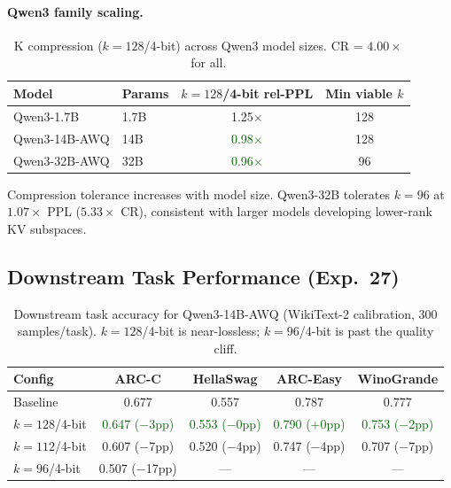 \documentclass{article}
\begin{document}
\paragraph{Qwen3 family scaling.}
\begin{table}[h]
  \centering
  \caption{K compression ($k{=}128$/4-bit) across Qwen3 model sizes. CR =
  $4.00{\times}$ for all.}
  \label{tab:qwen_scale}
  \begin{tabular}{@{}llcc@{}}
    \toprule
    Model & Params & $k{=}128$/4-bit rel-PPL & Min viable $k$ \\
    \midrule
    Qwen3-1.7B    & 1.7B  & 1.25$\times$ & 128 \\
    Qwen3-14B-AWQ & 14B   & \textcolor{darkgreen}{0.98$\times$} & 128 \\
    Qwen3-32B-AWQ & 32B   & \textcolor{darkgreen}{0.96$\times$} & 96  \\
    \bottomrule
  \end{tabular}
\end{table}

Compression tolerance increases with model size. Qwen3-32B tolerates $k{=}96$ at
$1.07{\times}$ PPL ($5.33{\times}$ CR), consistent with larger models developing lower-rank
KV subspaces.

\subsection{Downstream Task Performance (Exp.~27)}
\label{sec:downstream}

\begin{table}[h]
  \centering
  \caption{Downstream task accuracy for Qwen3-14B-AWQ (WikiText-2 calibration,
  300 samples/task). $k{=}128$/4-bit is near-lossless; $k{=}96$/4-bit is past the
  quality cliff.}
  \label{tab:downstream}
  \begin{tabular}{@{}lcccc@{}}
    \toprule
    Config & ARC-C & HellaSwag & ARC-Easy & WinoGrande \\
    \midrule
    Baseline            & 0.677 & 0.557 & 0.787 & 0.777 \\
    $k{=}128$/4-bit     & \textcolor{darkgreen}{0.647 ($-$3pp)} & \textcolor{darkgreen}{0.553 ($-$0pp)} & \textcolor{darkgreen}{0.790 ($+$0pp)} & \textcolor{darkgreen}{0.753 ($-$2pp)} \\
    $k{=}112$/4-bit     & 0.607 ($-$7pp) & 0.520 ($-$4pp) & 0.747 ($-$4pp) & 0.707 ($-$7pp) \\
    $k{=}96$/4-bit      & 0.507 ($-$17pp) & --- & --- & --- \\
    \bottomrule
  \end{tabular}
\end{table}
\end{document}
